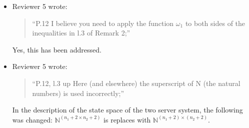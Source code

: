 \documentclass{article}
\begin{document}
\begin{itemize}
\item Reviewer 5 wrote:
\begin{quote}
``P.12 I believe you need to apply the function $\omega_1$ to both sides of the
inequalities in l.3 of Remark 2;''
\end{quote}
Yes, this has been addressed.

\item Reviewer 5 wrote:
\begin{quote}
``P.12, l.3 up Here (and elsewhere) the superscript of N (the natural numbers)
is used incorrectly;''
\end{quote}
In the description of the state space of the two server system, the following
was changed: $\mathbb{N}^{(n_1+2\times n_2+2)}$ is replaces with
$\mathbb{N}^{(n_1+2)\times (n_2+2)}$.



\end{itemize}
\end{document}
